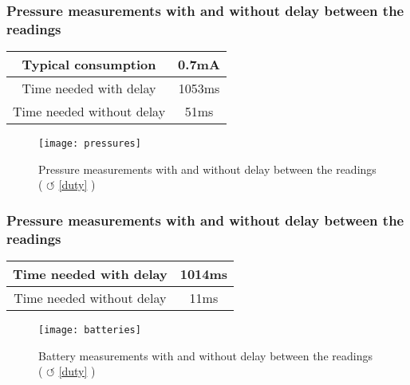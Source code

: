 \subsubsection{Pressure measurements with and without delay between the readings}
\begin{table}[!hb]
\begin{center}
\begin{tabular}[!hb]{|c|c|}
\hline
Typical consumption  & 0.7mA\\
\hline
Time needed with delay & 1053ms\\
\hline
Time needed without delay & 51ms\\
\hline
\end{tabular}
\label{tab:sleep1}
\end{center}
\end{table}
\begin{figure}[htbp]
\centering
\texttt{[image: pressures]}
\caption{Pressure measurements with and without delay between the readings ( $\circlearrowleft$ \ref{duty} )}
\label{fig:pressures}
\end{figure} 
\vfill
\pagebreak
\subsubsection{Pressure measurements with and without delay between the readings}
\begin{table}[!hb]
\begin{center}
\begin{tabular}[!hb]{|c|c|}
\hline
Time needed with delay & 1014ms\\
\hline
Time needed without delay & 11ms\\
\hline
\end{tabular}
\label{tab:sleep1}
\end{center}
\end{table}
\begin{figure}[htbp]
\centering
\texttt{[image: batteries]}
\caption{Battery measurements with and without delay between the readings ( $\circlearrowleft$ \ref{duty} )}
\label{fig:batteries}
\end{figure} 
\vfill
\pagebreak